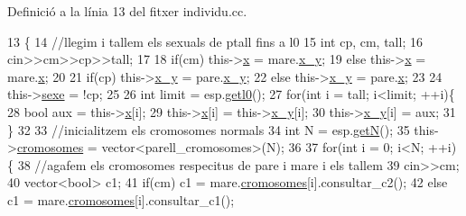 Definició a la línia 13 del fitxer individu.\+cc.


\begin{DoxyCode}
13                                                                        \{
14         \textcolor{comment}{//llegim i tallem els sexuals de ptall fins a l0}
15         \textcolor{keywordtype}{int} cp, cm, tall;
16         cin>>cm>>cp>>tall;
17 
18         \textcolor{keywordflow}{if}(cm) this->\hyperlink{classindividu_a3c4abda8daead156b5519f69bd224fa9}{x} = mare.\hyperlink{classindividu_a51eb7827fdd5bd5302e3c962fd719fc0}{x\_y};
19         \textcolor{keywordflow}{else} this->\hyperlink{classindividu_a3c4abda8daead156b5519f69bd224fa9}{x} = mare.\hyperlink{classindividu_a3c4abda8daead156b5519f69bd224fa9}{x};
20 
21         \textcolor{keywordflow}{if}(cp) this->\hyperlink{classindividu_a51eb7827fdd5bd5302e3c962fd719fc0}{x\_y} = pare.\hyperlink{classindividu_a51eb7827fdd5bd5302e3c962fd719fc0}{x\_y};
22         \textcolor{keywordflow}{else} this->\hyperlink{classindividu_a51eb7827fdd5bd5302e3c962fd719fc0}{x\_y} = pare.\hyperlink{classindividu_a3c4abda8daead156b5519f69bd224fa9}{x};
23 
24         this->\hyperlink{classindividu_ab62faa6985cc0520c33a206fc5a89e37}{sexe} = !cp;
25 
26         \textcolor{keywordtype}{int} limit = esp.\hyperlink{classespecie_a5ea723fe64398cd46cbc6e044b114fff}{getl0}();
27         \textcolor{keywordflow}{for}(\textcolor{keywordtype}{int} i = tall; i<limit; ++i)\{
28                 \textcolor{keywordtype}{bool} aux = this->\hyperlink{classindividu_a3c4abda8daead156b5519f69bd224fa9}{x}[i];
29                 this->\hyperlink{classindividu_a3c4abda8daead156b5519f69bd224fa9}{x}[i] = this->\hyperlink{classindividu_a51eb7827fdd5bd5302e3c962fd719fc0}{x\_y}[i];
30                 this->\hyperlink{classindividu_a51eb7827fdd5bd5302e3c962fd719fc0}{x\_y}[i] = aux;
31         \}
32 
33         \textcolor{comment}{//inicialitzem els cromosomes normals}
34         \textcolor{keywordtype}{int} N = esp.\hyperlink{classespecie_a16cbac301660254cf39ef7f51690e507}{getN}();
35         this->\hyperlink{classindividu_ae5e0a83ff9e943cbcdf95b74069ad3a7}{cromosomes} = vector<parell\_cromosomes>(N);
36 
37         \textcolor{keywordflow}{for}(\textcolor{keywordtype}{int} i = 0; i<N; ++i)\{
38                 \textcolor{comment}{//agafem els cromosomes respecitus de pare i mare i els tallem}
39                 cin>>cm;
40                 vector<bool> c1;
41                 \textcolor{keywordflow}{if}(cm) c1 = mare.\hyperlink{classindividu_ae5e0a83ff9e943cbcdf95b74069ad3a7}{cromosomes}[i].consultar\_c2();
42                 \textcolor{keywordflow}{else} c1 = mare.\hyperlink{classindividu_ae5e0a83ff9e943cbcdf95b74069ad3a7}{cromosomes}[i].consultar\_c1();

\end{DoxyCode}

